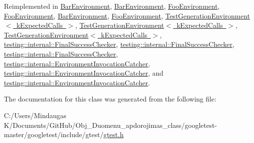 Reimplemented in \mbox{\hyperlink{class_bar_environment_ac02b15d5b27e33232c578f0340442bbb}{Bar\+Environment}}, \mbox{\hyperlink{class_bar_environment_ac02b15d5b27e33232c578f0340442bbb}{Bar\+Environment}}, \mbox{\hyperlink{class_foo_environment_a68511512cce59c5b848dc23b1300dc5a}{Foo\+Environment}}, \mbox{\hyperlink{class_foo_environment_a68511512cce59c5b848dc23b1300dc5a}{Foo\+Environment}}, \mbox{\hyperlink{class_bar_environment_a384f951da72a2a18bb0c2b3506376b09}{Bar\+Environment}}, \mbox{\hyperlink{class_foo_environment_a99a2c9df52106cce9e7a4bdda53df802}{Foo\+Environment}}, \mbox{\hyperlink{class_test_generation_environment_ac3787d8afb43b97b0b3d6dec78b04798}{Test\+Generation\+Environment$<$ k\+Expected\+Calls $>$}}, \mbox{\hyperlink{class_test_generation_environment_af7731d3161d89e3bd456cd204e2c4890}{Test\+Generation\+Environment$<$ k\+Expected\+Calls $>$}}, \mbox{\hyperlink{class_test_generation_environment_af7731d3161d89e3bd456cd204e2c4890}{Test\+Generation\+Environment$<$ k\+Expected\+Calls $>$}}, \mbox{\hyperlink{classtesting_1_1internal_1_1_final_success_checker_a15ba1169b52bbf73a3ccea0c9f55cefd}{testing\+::internal\+::\+Final\+Success\+Checker}}, \mbox{\hyperlink{classtesting_1_1internal_1_1_final_success_checker_a15ba1169b52bbf73a3ccea0c9f55cefd}{testing\+::internal\+::\+Final\+Success\+Checker}}, \mbox{\hyperlink{classtesting_1_1internal_1_1_final_success_checker_a8f39d12a1f2bfe8c6c04b5c6749382c9}{testing\+::internal\+::\+Final\+Success\+Checker}}, \mbox{\hyperlink{classtesting_1_1internal_1_1_environment_invocation_catcher_a50097d7cb8997fef0e2df90a564949f0}{testing\+::internal\+::\+Environment\+Invocation\+Catcher}}, \mbox{\hyperlink{classtesting_1_1internal_1_1_environment_invocation_catcher_a50097d7cb8997fef0e2df90a564949f0}{testing\+::internal\+::\+Environment\+Invocation\+Catcher}}, and \mbox{\hyperlink{classtesting_1_1internal_1_1_environment_invocation_catcher_afc89ee0a8e32e6746a89fcc1682f62e9}{testing\+::internal\+::\+Environment\+Invocation\+Catcher}}.



The documentation for this class was generated from the following file\+:\begin{DoxyCompactItemize}
\item 
C\+:/\+Users/\+Mindaugas K/\+Documents/\+Git\+Hub/\+Obj\+\_\+\+Duomenu\+\_\+apdorojimas\+\_\+class/googletest-\/master/googletest/include/gtest/\mbox{\hyperlink{googletest-master_2googletest_2include_2gtest_2gtest_8h}{gtest.\+h}}\end{DoxyCompactItemize}
